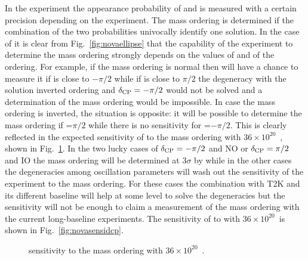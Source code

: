 In the experiment the appearance probability of \nue and \nueb is measured with a certain precision depending on the experiment. The mass ordering is determined if the combination of the two probabilities univocally identify one solution. In the case of \nova it is clear from Fig.~\ref{fig:novaellipse} that the capability of the experiment to determine the mass ordering strongly depends on the values of \dcp and of the ordering. For example, if the mass ordering is normal then \nova will have a chance to measure it if \dcp is close to $-\pi/2$ while if \dcp is close to $\pi/2$ the degeneracy with the solution inverted ordering and $\delta_{\mathrm{CP}}=-\pi/2$ would not be solved and a determination of the mass ordering would be impossible. In case the mass ordering is inverted, the situation is opposite: it will be possible to determine the mass ordering if \dcp=$\pi/2$ while there is no sensitivity for \dcp=$-\pi/2$. This is clearly reflected in the expected sensitivity of \nova to the mass ordering with $36\times10^{20}$~\pot, shown in Fig.~\ref{fig:novasensi}.
In the two lucky cases of $\delta_{\mathrm{CP}}=-\pi/2$ and NO or $\delta_{\mathrm{CP}}=\pi/2$ and IO the mass ordering will be determined at $3\sigma$ by \nova while in the other cases the degeneracies among oscillation parameters will wash out the sensitivity of the experiment to the mass ordering. For these cases the combination with T2K and its different baseline will help at some level to solve the degeneracies but the sensitivity will not be enough to claim a measurement of the mass ordering with the current long-baseline experiments. The sensitivity of \nova to \dcp with  $36\times10^{20}$~\pot is shown in Fig.~\ref{fig:novasensidcp}.


\begin{figure} [h!]
\begin{center}
\caption{\label{fig:novasensi} \nova sensitivity to the mass ordering with $36\times10^20$~\pot.}
\end{center}
\end{figure}







